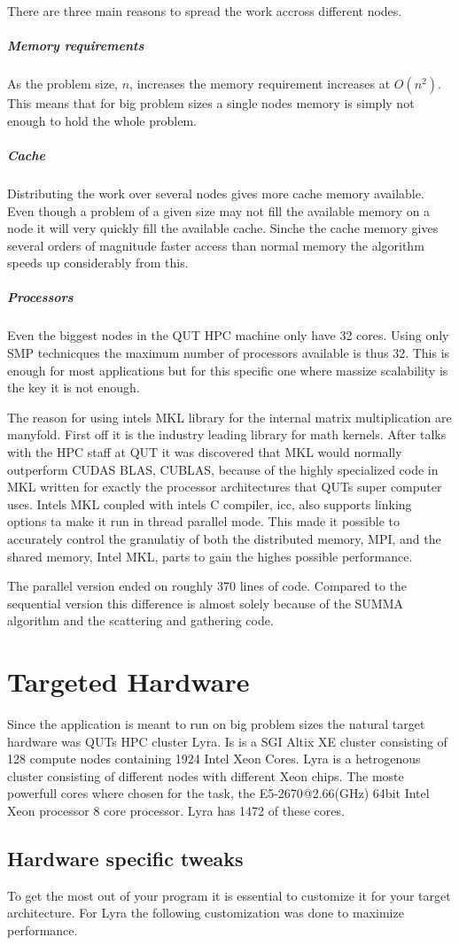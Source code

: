 \documentclass{article}
\begin{document}
There are three main reasons to spread the work accross different nodes.
\subparagraph{Memory requirements}
As the problem size, $n$, increases the memory requirement increases at $O(n^2)$. This means that for
big problem sizes a single nodes memory is simply not enough to hold the whole problem.
\subparagraph{Cache}
Distributing the work over several nodes gives more cache memory available. Even though a problem
of a given size may not fill the available memory on a node it will very quickly fill the available
cache. Sinche the cache memory gives several orders of magnitude faster access than normal memory
the algorithm speeds up considerably from this.
\subparagraph{Processors}
Even the biggest nodes in the QUT HPC machine only have 32 cores. Using only SMP technicques
the maximum number of processors available is thus 32. This is enough for most applications but
for this specific one where massize scalability is the key it is not enough.

The reason for using intels MKL library for the internal matrix multiplication are manyfold. First
off it is the industry leading library for math kernels. After talks with the HPC staff at QUT it was
discovered that MKL would normally outperform CUDAS BLAS, CUBLAS, because of the highly specialized code
in MKL written for exactly the processor architectures that QUTs super computer uses. Intels MKL coupled
with intels C compiler, icc, also supports linking options ta make it run in thread parallel mode. This
made it possible to accurately control the granulatiy of both the distributed memory, MPI, and the
shared memory, Intel MKL, parts to gain the highes possible performance.

The parallel version ended on roughly 370 lines of code. Compared to the sequential version this difference
is almost solely because of the SUMMA algorithm and the scattering and gathering code.

\section{Targeted Hardware}
Since the application is meant to run on big problem sizes the natural target hardware was QUTs
HPC cluster Lyra. Is is a SGI Altix XE cluster consisting of 128 compute nodes containing 1924 Intel Xeon Cores. Lyra is a
hetrogenous cluster consisting of different nodes with different Xeon chips.
The moste powerfull cores where chosen for the task, the E5-2670@2.66(GHz) 64bit Intel Xeon processor 8 core processor.
Lyra has 1472 of these cores.
\subsection{Hardware specific tweaks}
To get the most out of your program it is essential to customize it for your target architecture.
For Lyra the following customization was done to maximize performance.
\end{document}
